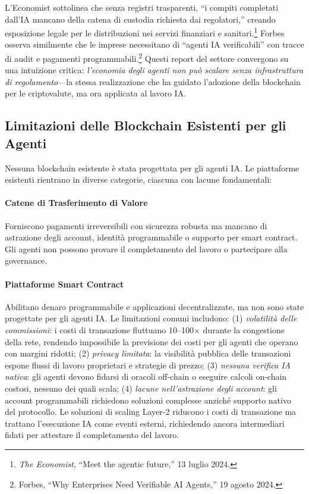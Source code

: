 \documentclass[11pt]{article}
\begin{document}
L'Economist sottolinea che senza registri trasparenti, ``i compiti completati dall'IA mancano della catena di custodia richiesta dai regolatori,'' creando esposizione legale per le distribuzioni nei servizi finanziari e sanitari.\footnote{\emph{The Economist}, ``Meet the agentic future,'' 13 luglio 2024.} Forbes osserva similmente che le imprese necessitano di ``agenti IA verificabili'' con tracce di audit e pagamenti programmabili.\footnote{Forbes, ``Why Enterprises Need Verifiable AI Agents,'' 19 agosto 2024.} Questi report del settore convergono su una intuizione critica: \emph{l'economia degli agenti non può scalare senza infrastruttura di regolamento}---la stessa realizzazione che ha guidato l'adozione della blockchain per le criptovalute, ma ora applicata al lavoro IA.

\subsection{Limitazioni delle Blockchain Esistenti per gli Agenti}
Nessuna blockchain esistente è stata progettata per gli agenti IA. Le piattaforme esistenti rientrano in diverse categorie, ciascuna con lacune fondamentali:

\paragraph{Catene di Trasferimento di Valore} Forniscono pagamenti irreversibili con sicurezza robusta ma mancano di astrazione degli account, identità programmabile o supporto per smart contract. Gli agenti non possono provare il completamento del lavoro o partecipare alla governance.

\paragraph{Piattaforme Smart Contract} Abilitano denaro programmabile e applicazioni decentralizzate, ma non sono state progettate per gli agenti IA. Le limitazioni comuni includono: (1) \emph{volatilità delle commissioni}: i costi di transazione fluttuano 10--100$\times$ durante la congestione della rete, rendendo impossibile la previsione dei costi per gli agenti che operano con margini ridotti; (2) \emph{privacy limitata}: la visibilità pubblica delle transazioni espone flussi di lavoro proprietari e strategie di prezzo; (3) \emph{nessuna verifica IA nativa}: gli agenti devono fidarsi di oracoli off-chain o eseguire calcoli on-chain costosi, nessuno dei quali scala; (4) \emph{lacune nell'astrazione degli account}: gli account programmabili richiedono soluzioni complesse anziché supporto nativo del protocollo. Le soluzioni di scaling Layer-2 riducono i costi di transazione ma trattano l'esecuzione IA come eventi esterni, richiedendo ancora intermediari fidati per attestare il completamento del lavoro.
\end{document}
